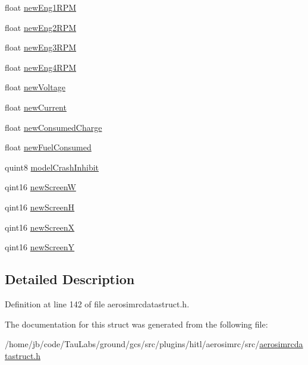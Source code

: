 \begin{DoxyCompactItemize}
\item 
float \hyperlink{group___aero_sim_r_c_ga8e41974881d85220a22aa7b1e10a6c8b}{new\-Eng1\-R\-P\-M}
\item 
float \hyperlink{group___aero_sim_r_c_gaf9f1bbadaada97aec5a72a47799dbb69}{new\-Eng2\-R\-P\-M}
\item 
float \hyperlink{group___aero_sim_r_c_ga1c7f49c14ce7325e93375b1973f36b91}{new\-Eng3\-R\-P\-M}
\item 
float \hyperlink{group___aero_sim_r_c_ga474540a6a0a35ece5e87974e07c99c87}{new\-Eng4\-R\-P\-M}
\item 
float \hyperlink{group___aero_sim_r_c_ga6a11d71df14bc0a5867c993a47da8f0f}{new\-Voltage}
\item 
float \hyperlink{group___aero_sim_r_c_ga7fd515830d601c3785dadd02ed64dcc0}{new\-Current}
\item 
float \hyperlink{group___aero_sim_r_c_gabb6455cde42e82e713838307779ab4f7}{new\-Consumed\-Charge}
\item 
float \hyperlink{group___aero_sim_r_c_ga8a8341d7559a5dfa620a7c486f2dc023}{new\-Fuel\-Consumed}
\item 
quint8 \hyperlink{group___aero_sim_r_c_gac766c17be7565d11f169ec43dac2113d}{model\-Crash\-Inhibit}
\item 
qint16 \hyperlink{group___aero_sim_r_c_ga73893f1a06af3481486ee34ef91001c0}{new\-Screen\-W}
\item 
qint16 \hyperlink{group___aero_sim_r_c_ga6ac6931958ba1a74ff06dbfe7dba5676}{new\-Screen\-H}
\item 
qint16 \hyperlink{group___aero_sim_r_c_gacb23e684331322adcce5771dc717ea18}{new\-Screen\-X}
\item 
qint16 \hyperlink{group___aero_sim_r_c_gad5aa10f7542e0fcf3d4ac3981efc93a2}{new\-Screen\-Y}
\end{DoxyCompactItemize}


\subsection{\-Detailed \-Description}


\-Definition at line 142 of file aerosimrcdatastruct.\-h.



\-The documentation for this struct was generated from the following file\-:\begin{DoxyCompactItemize}
\item 
/home/jb/code/\-Tau\-Labs/ground/gcs/src/plugins/hitl/aerosimrc/src/\hyperlink{aerosimrcdatastruct_8h}{aerosimrcdatastruct.\-h}\end{DoxyCompactItemize}
